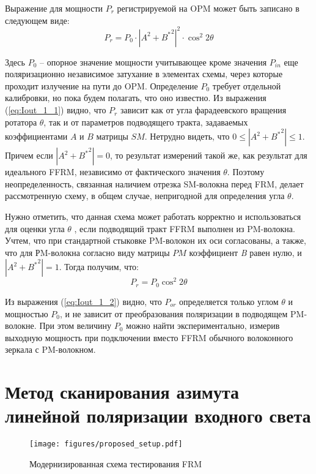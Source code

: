 \documentclass{article}
\begin{document}
Выражение для мощности $P_r$ регистрируемой на OPM может быть записано в следующем виде:
\begin{equation}
	\label{eq:Iout_1_1}
	P_{r} = P_0 \cdot \left| A^2 + {B^*}^2 \right|^2 \cdot \cos^2 2 \theta
\end{equation}

Здесь $P_0$ – опорное значение мощности учитывающее кроме значения $P_{in}$ еще поляризационно независимое затухание в элементах схемы, через которые проходит излучение на пути до OPM.
Определение $P_0$ требует отдельной калибровки, но пока будем полагать, что оно известно.
Из выражения (\ref{eq:Iout_1_1}) видно, что $P_{r}$ зависит как от угла фарадеевского вращения ротатора $\theta$, так и от параметров подводящего тракта, задаваемых коэффициентами $A$ и $B$ матрицы $SM$.
Нетрудно видеть, что  $0\le\left| A^2 + {B^*}^2 \right|\le1$.
Причем если $\left| A^2 + {B^*}^2 \right|=0$, то результат измерений такой же, как результат для идеального FFRM, независимо от фактического значения  $\theta$.
Поэтому неопределенность, связанная наличием отрезка SM-волокна перед FRM, делает рассмотренную схему, в общем случае, непригодной для определения угла $\theta$.

Нужно отметить, что данная схема может работать корректно и использоваться для оценки  угла $\theta$ , если подводящий тракт FFRM выполнен из PM-волокна.
Учтем, что при стандартной стыковке PM-волокон их оси согласованы, а также, что для РM-волокна согласно виду матрицы $PM$ коэффициент \textit{B} равен нулю, и $\left| A^2 + {B^*}^2 \right| = 1$.
Тогда получим, что: 
\begin{equation}
	\label{eq:Iout_1_2}
	P_{r} =  P_0 \cos^2 2 \theta 
\end{equation}

Из выражения (\ref{eq:Iout_1_2}) видно, что $P_{or}$ определяется только углом  $\theta$ и мощностью $P_0$, и не зависит от преобразования поляризации в подводящем PM-волокне.
При этом величину $P_0$ можно найти экспериментально, измерив выходную мощность при подключении вместо FFRM обычного волоконного зеркала с PM-волокном.


\section{Метод сканирования азимута линейной поляризации входного света}
\begin{figure}[b]
	\centering
	\texttt{[image: figures/proposed\_setup.pdf]}
	\caption{Модернизированная схема тестирования FRM}
	\label{fig:proposed_setup}
\end{figure} 
\end{document}
